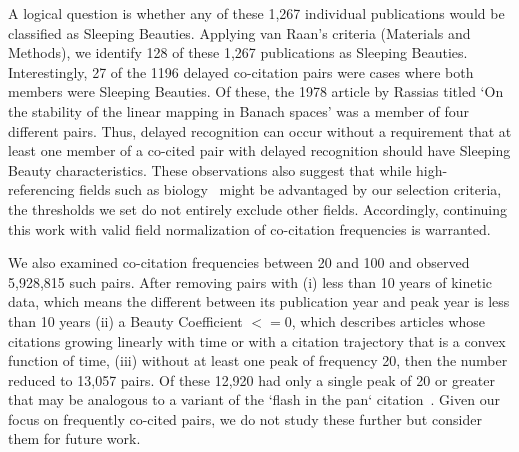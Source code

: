 \documentclass[utf8]{frontiersSCNS}
\begin{document}
A logical question is whether any of these 1,267 individual publications would be classified as Sleeping Beauties. Applying van Raan's criteria (Materials and Methods), we identify 128 of these 1,267 publications as Sleeping Beauties. Interestingly, 27 of the 1196 delayed co-citation pairs were cases where both members were Sleeping Beauties. Of these, the 1978 article by Rassias titled `On the stability of the linear mapping in Banach spaces' was a member of four different pairs. Thus, delayed recognition can occur without a requirement that at least one member of a co-cited pair with delayed recognition should have Sleeping Beauty characteristics. These  observations also suggest that while high-referencing fields such as biology~\citep{Small1980} might be advantaged by our selection criteria, the thresholds we set do not entirely exclude other fields. Accordingly, continuing this work with valid field normalization of co-citation frequencies is warranted.

We also examined co-citation frequencies between 20 and 100 and observed 5,928,815 such pairs. After removing pairs with (i) less than 10 years of kinetic data, which means the different between its publication year and peak year is less than 10 years (ii) a Beauty Coefficient $<=0$, which describes articles whose citations growing linearly with time or with a citation trajectory that is a convex function of time, (iii) without at least one peak of frequency 20, then the number reduced to 13,057 pairs. Of these 12,920 had only a single peak of 20 or greater that may be analogous to a variant of the `flash in the pan` citation~\citep{Li2013CitationCO,ye_bornmann_2018}. Given our focus on frequently co-cited pairs, we do not study these further but consider them for future work.
\end{document}
